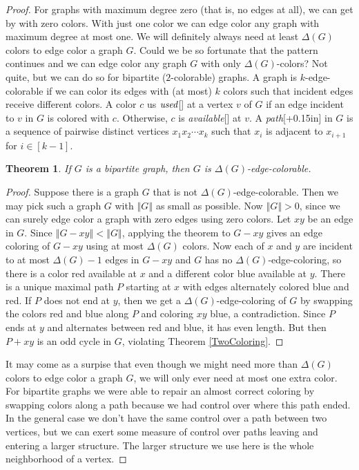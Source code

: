 \documentclass{amsbook}
\newcommand{\aaside}[2]{\marginnote{\scriptsize{#1}}[#2]}
\theoremstyle{plain}
\newtheorem{theorem}{Theorem}
\numberwithin{equation}{chapter}
\newcommand{\size}[1]{\left\Vert#1\right\Vert}
\newcommand{\irange}[1]{\left[#1\right]}
\begin{document}
\begin{proof}
For graphs with maximum degree zero (that is, no edges at all), we can get by with zero colors.  
With just one color we can edge color any graph with maximum degree at most one.  We will definitely always need at least $\Delta(G)$ colors
to edge color a graph $G$.  Could we be so fortunate that the pattern continues
and we can edge color any graph $G$ with only $\Delta(G)$-colors? Not quite, but we can do so for bipartite ($2$-colorable) graphs.
A graph is $k$-edge-colorable if we can color its edges with (at most) $k$ colors such that incident edges receive different colors.
A color $c$ us $\emph{used}$\aaside{used}{} at a vertex $v$ of $G$ if an edge incident to $v$ in $G$ is colored with $c$. Otherwise, $c$ is \emph{available}\aaside{available}{} at $v$.
A \emph{path}\aaside{path}{+0.15in} in $G$ is a sequence of pairwise distinct vertices $x_1x_2\cdots x_k$ such that $x_i$ is adjacent to $x_{i+1}$ for $i \in \irange{k-1}$.

\begin{theorem}\label{DeltaEdgeColoring}
If $G$ is a bipartite graph, then $G$ is $\Delta(G)$-edge-colorable.
\end{theorem}
\begin{proof}
Suppose there is a graph $G$ that is not $\Delta(G)$-edge-colorable.  Then we may pick such a graph $G$ with $\size{G}$ as small as possible.
Now $\size{G} > 0$, since we can surely edge color a graph with zero edges using zero colors.  Let $xy$ be an edge in $G$.  Since $\size{G-xy} < \size{G}$,
applying the theorem to $G-xy$ gives an edge coloring of $G-xy$ using at most $\Delta(G)$ colors.  Now each of $x$ and $y$ are incident to at most $\Delta(G) - 1$ edges
in $G-xy$ and $G$ has no $\Delta(G)$-edge-coloring, so there is a color red available at $x$ and a different color blue available at $y$.  There is a unique maximal 
path $P$ starting at $x$ with edges alternately colored blue and red. If $P$ does not end at $y$, then we get a $\Delta(G)$-edge-coloring of $G$ by swapping the colors red and blue 
along $P$ and coloring $xy$ blue, a contradiction.  Since $P$ ends at $y$ and alternates between red and blue, it has even length.  But then $P + xy$ is an odd cycle in $G$, violating
Theorem \ref{TwoColoring}.
\end{proof}

It may come as a surpise that even though we might need more than $\Delta(G)$ colors to edge color a graph $G$, we will only ever need at most one extra color.
For bipartite graphs we were able to repair an almost correct coloring by swapping colors along a path because we had control over where this path ended.  In the
general case we don't have the same control over a path between two vertices, but we can exert some measure of control over paths leaving and entering a larger structure. 
The larger structure we use here is the whole neighborhood of a vertex.


\end{proof}
\end{document}
